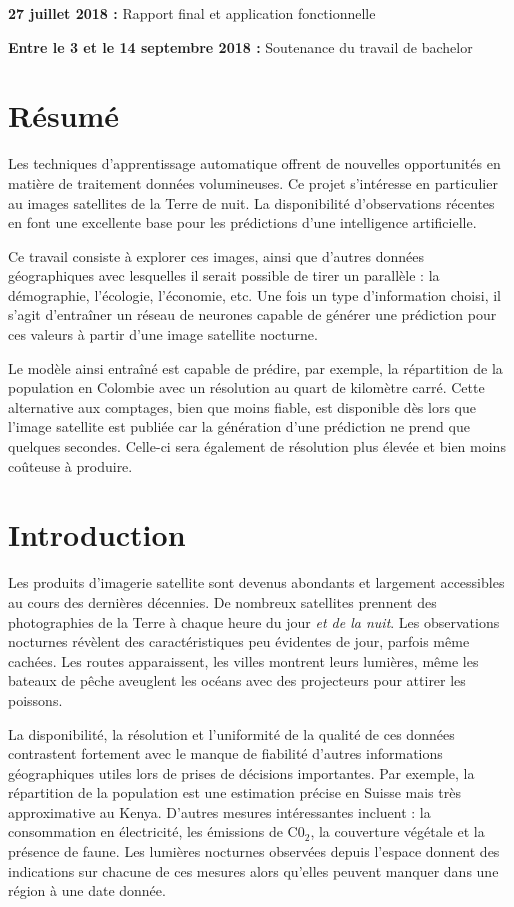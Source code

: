 \documentclass[a4paper, 11pt]{report}
\begin{document}
\textbf{27 juillet 2018 :} Rapport final et application fonctionnelle

\textbf{Entre le 3 et le 14 septembre 2018 :} Soutenance du travail de bachelor

\chapter{Résumé}

Les techniques d'apprentissage automatique offrent de nouvelles opportunités en matière de traitement données volumineuses. Ce projet s'intéresse en particulier au images satellites de la Terre de nuit. La disponibilité d'observations récentes en font une excellente base pour les prédictions d'une intelligence artificielle.

Ce travail consiste à explorer ces images, ainsi que d'autres données géographiques avec lesquelles il serait possible de tirer un parallèle : la démographie, l'écologie, l'économie, etc. Une fois un type d'information choisi, il s'agit d'entraîner un réseau de neurones capable de générer une prédiction pour ces valeurs à partir d'une image satellite nocturne.

Le modèle ainsi entraîné est capable de prédire, par exemple, la répartition de la population en Colombie avec un résolution au quart de kilomètre carré. Cette alternative aux comptages, bien que moins fiable, est disponible dès lors que l'image satellite est publiée car la génération d'une prédiction ne prend que quelques secondes. Celle-ci sera également de résolution plus élevée et bien moins coûteuse à produire.

\chapter{Introduction}
Les produits d'imagerie satellite sont devenus abondants et largement accessibles au cours des dernières décennies. De nombreux satellites prennent des photographies de la Terre à chaque heure du jour \textit{et de la nuit}. Les observations nocturnes révèlent des caractéristiques peu évidentes de jour, parfois même cachées. Les routes apparaissent, les villes montrent leurs lumières, même les bateaux de pêche aveuglent les océans avec des projecteurs pour attirer les poissons.

La disponibilité, la résolution et l'uniformité de la qualité de ces données contrastent fortement avec le manque de fiabilité d'autres informations géographiques utiles lors de prises de décisions importantes. Par exemple, la répartition de la population est une estimation précise en Suisse mais très approximative au Kenya. D'autres mesures intéressantes incluent : la consommation en électricité, les émissions de C0$_2$, la couverture végétale et la présence de faune. Les lumières nocturnes observées depuis l'espace donnent des indications sur chacune de ces mesures alors qu'elles peuvent manquer dans une région à une date donnée.
\end{document}
